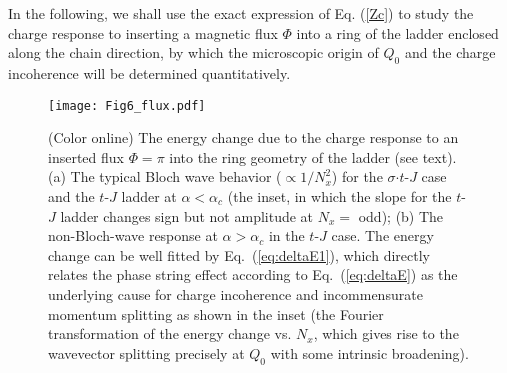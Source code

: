 \documentclass[aps,prb,twocolumn,notitlepage,superscriptaddress,showpacs]{revtex4-1}
\begin{document}
In the following, we shall use the exact expression of Eq. (\ref{Zc}) to study the charge response to inserting a magnetic flux $\Phi$ into a ring of the ladder enclosed along the chain direction, by which the microscopic origin of $Q_0$ and the charge incoherence will be determined quantitatively.


\begin{figure}[t]
\begin{center}
\texttt{[image: Fig6\_flux.pdf]}
\end{center}
\par
\renewcommand{\figurename}{Fig.}
\caption{(Color online) The energy change due to the charge response to an inserted flux $\Phi=\pi$ into the ring geometry of the ladder (see text). (a) The typical Bloch wave behavior ($\propto 1/N_x^2$) for the $\sigma$$\cdot$$t$-$J$ case and the $t$-$J$ ladder at $\alpha<\alpha_c$ (the inset, in which the slope for the $t$-$J$ ladder changes sign but not amplitude at $N_x=$ odd);  (b) The non-Bloch-wave response at $\alpha>\alpha_c$ in the $t$-$J$ case. The energy change can be well fitted by Eq.~(\ref{eq:deltaE1}), which directly relates the phase string effect according to Eq.~(\ref{eq:deltaE}) as the underlying cause for charge incoherence and incommensurate momentum splitting as shown in the inset (the Fourier transformation of the energy change vs. $N_x$, which gives rise to the wavevector splitting precisely at $Q_0$ with some intrinsic broadening). }
\label{Fig:inch}
\end{figure}
\end{document}
